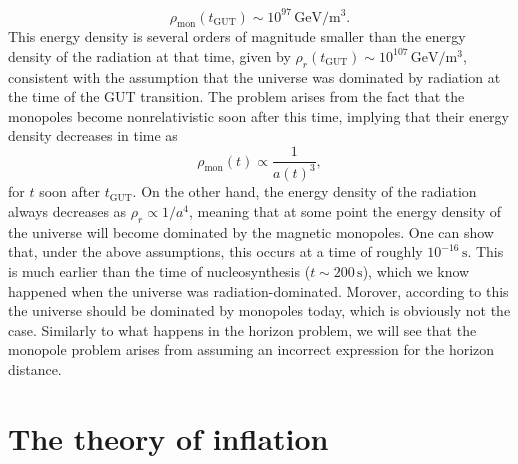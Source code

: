 \begin{equation}
\rho_{\mathrm{mon}}(t_{\mathrm{GUT}})\sim 10^{97}\,\mathrm{GeV/m^3}.
\end{equation}
This energy density is several orders of magnitude smaller than the energy density of the radiation at that time, given by $\rho_r(t_{\mathrm{GUT}})\sim 10^{107}\,\mathrm{GeV/m^3}$, consistent with the assumption that the universe was dominated by radiation at the time of the GUT transition. The problem arises from the fact that the monopoles become nonrelativistic soon after this time, implying that their energy density decreases in time as
\begin{equation}
\rho_{\mathrm{mon}}(t)\propto \frac{1}{a(t)^3},
\end{equation}
for $t$ soon after $t_{\mathrm{GUT}}$. On the other hand, the energy density of the radiation always decreases as $\rho_r\propto 1/a^4$, meaning that at some point the energy density of the universe will become dominated by the magnetic monopoles. One can show that, under the above assumptions, this occurs at a time of roughly $10^{-16}\,\mathrm{s}$. This is much earlier than the time of nucleosynthesis ($t\sim 200\,\mathrm{s}$), which we know happened when the universe was radiation-dominated. Morover, according to this the universe should be dominated by monopoles today, which is obviously not the case. Similarly to what happens in the horizon problem, we will see that the monopole problem arises from assuming an incorrect expression for the horizon distance.

\section{The theory of inflation}

